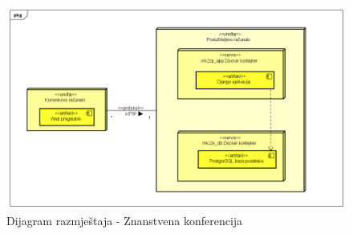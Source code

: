 {			 
			\begin{figure}[H]
			 	\includegraphics[width= 15 cm, height= 25 cm, keepaspectratio]{dijagrami/Diagram razmjestaja.png} 
			 	\centering
			 	\caption{Dijagram razmještaja - Znanstvena konferencija}
			 	\label{fig:act5}
			 \end{figure}
			
			\eject 
		
}

